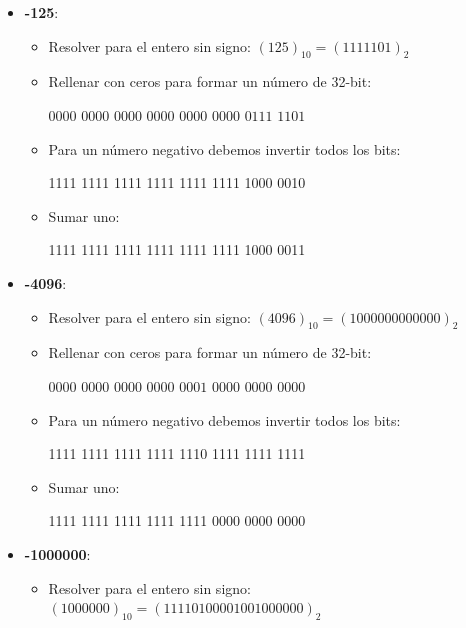 \documentclass[11pt]{article}
\begin{document}
	\begin{itemize}
		\item \textbf{-125}:
		\begin{itemize}
			\item Resolver para el entero sin signo: $(125)_{10}=(1111101)_2$
			
			\item Rellenar con ceros para formar un número de 32-bit: 
			
			$0000$ $0000$ $0000$ $0000$ $0000$ $0000$ $0111$ $1101$
			
			\item Para un número negativo debemos invertir todos los bits:
			
			1111 1111 1111 1111 1111 1111 1000 0010
			
			\item Sumar uno:
			
			1111 1111 1111 1111 1111 1111 1000 0011
			
			
		\end{itemize}
		
		
		
		\item \textbf{-4096}:
		\begin{itemize}
			\item Resolver para el entero sin signo: $(4096)_{10}=(1 0000 0000 0000)_2$
			
			\item Rellenar con ceros para formar un número de 32-bit: 
			
			$0000$ $0000$ $0000$ $0000$ $0001$ $0000$ $0000$ $0000$
			
			\item Para un número negativo debemos invertir todos los bits:
			
			1111 1111 1111 1111 1110 1111 1111 1111
			
			\item Sumar uno:
			
			1111 1111 1111 1111 1111 0000 0000 0000
		
			
			
		\end{itemize}
		
		
			
		\item \textbf{-1000000}:
		\begin{itemize}
			\item Resolver para el entero sin signo: $(1000000)_{10}=(1111 0100 0010 0100 0000)_2$
			

\end{itemize}
\end{itemize}
\end{document}

